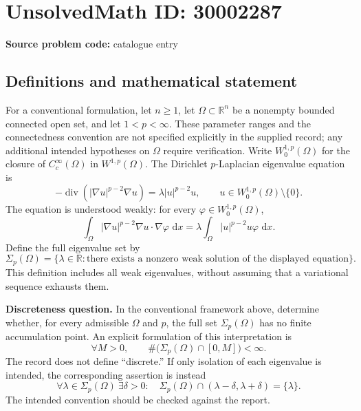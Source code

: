 \documentclass[11pt]{article}
\newcommand{\R}{\mathbb{R}}
\newcommand{\dd}{\,\mathrm{d}}
\begin{document}
\section*{UnsolvedMath ID: 30002287}
\textbf{Source problem code:} catalogue entry
\subsection{Definitions and mathematical statement}
For a conventional formulation, let \(n\geq 1\), let \(\Omega\subset\R^n\) be a nonempty bounded connected open set, and let \(1<p<\infty\). These parameter ranges and the connectedness convention are not specified explicitly in the supplied record; any additional intended hypotheses on \(\Omega\) require verification. Write \(W^{1,p}_0(\Omega)\) for the closure of \(C_c^\infty(\Omega)\) in \(W^{1,p}(\Omega)\). The Dirichlet \(p\)-Laplacian eigenvalue equation is
\[
-\operatorname{div}(|\nabla u|^{p-2}\nabla u)=\lambda |u|^{p-2}u,
\qquad u\in W^{1,p}_0(\Omega)\setminus\{0\}.
\]
The equation is understood weakly: for every \(\varphi\in W^{1,p}_0(\Omega)\),
\[
\int_\Omega |\nabla u|^{p-2}\nabla u\cdot\nabla\varphi\,\dd x
=\lambda\int_\Omega |u|^{p-2}u\varphi\,\dd x.
\]
Define the full eigenvalue set by
\[
\Sigma_p(\Omega)=\{\lambda\in\R:\text{there exists a nonzero weak solution of the displayed equation}\}.
\]
This definition includes all weak eigenvalues, without assuming that a variational sequence exhausts them.

\textbf{Discreteness question.} In the conventional framework above, determine whether, for every admissible \(\Omega\) and \(p\), the full set \(\Sigma_p(\Omega)\) has no finite accumulation point. An explicit formulation of this interpretation is
\[
\forall M>0,\qquad \#\bigl(\Sigma_p(\Omega)\cap[0,M]\bigr)<\infty.
\]
The record does not define ``discrete.'' If only isolation of each eigenvalue is intended, the corresponding assertion is instead
\[
\forall\lambda\in\Sigma_p(\Omega)\ \exists\delta>0:\quad
\Sigma_p(\Omega)\cap(\lambda-\delta,\lambda+\delta)=\{\lambda\}.
\]
The intended convention should be checked against the report.
\end{document}
